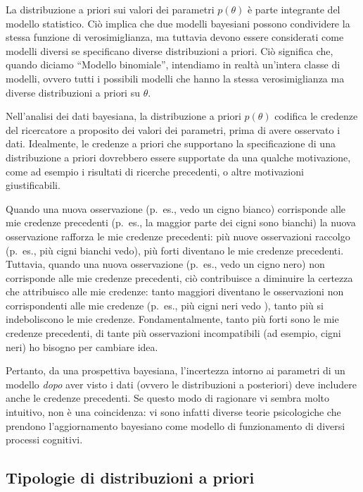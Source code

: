 \documentclass[
  11pt,
]{krantz}
\theoremstyle{definition}
\theoremstyle{definition}
\theoremstyle{definition}
\theoremstyle{definition}
\theoremstyle{remark}
\begin{document}
La distribuzione a priori sui valori dei parametri \(p(\theta)\) è parte integrante del modello statistico. Ciò implica che due modelli bayesiani possono condividere la stessa funzione di verosimiglianza, ma tuttavia devono essere considerati come modelli diversi se specificano diverse distribuzioni a priori. Ciò significa che, quando diciamo ``Modello binomiale'', intendiamo in realtà un'intera classe di modelli, ovvero tutti i possibili modelli che hanno la stessa verosimiglianza ma diverse distribuzioni a priori su \(\theta\).

Nell'analisi dei dati bayesiana, la distribuzione a priori \(p(\theta)\) codifica le credenze del ricercatore a proposito dei valori dei parametri, prima di avere osservato i dati. Idealmente, le credenze a priori che supportano la specificazione di una distribuzione a priori dovrebbero essere supportate da una qualche motivazione, come ad esempio i risultati di ricerche precedenti, o altre motivazioni giustificabili.

Quando una nuova osservazione (p.~es., vedo un cigno bianco) corrisponde alle mie credenze precedenti (p.~es., la maggior parte dei cigni sono bianchi) la nuova osservazione rafforza le mie credenze precedenti: più nuove osservazioni raccolgo (p.~es., più cigni bianchi vedo), più forti diventano le mie credenze precedenti. Tuttavia, quando una nuova osservazione (p.~es., vedo un cigno nero) non corrisponde alle mie credenze precedenti, ciò contribuisce a diminuire la certezza che attribuisco alle mie credenze: tanto maggiori diventano le osservazioni non corrispondenti alle mie credenze (p.~es., più cigni neri vedo ), tanto più si indeboliscono le mie credenze. Fondamentalmente, tanto più forti sono le mie credenze precedenti, di tante più osservazioni incompatibili (ad esempio, cigni neri) ho bisogno per cambiare idea.

Pertanto, da una prospettiva bayesiana, l'incertezza intorno ai parametri di un modello \emph{dopo} aver visto i dati (ovvero le distribuzioni a posteriori) deve includere anche le credenze precedenti. Se questo modo di ragionare vi sembra molto intuitivo, non è una coincidenza: vi sono infatti diverse teorie psicologiche che prendono l'aggiornamento bayesiano come modello di funzionamento di diversi processi cognitivi.

\hypertarget{tipologie-di-distribuzioni-a-priori}{%
\subsection{Tipologie di distribuzioni a priori}\label{tipologie-di-distribuzioni-a-priori}}
\end{document}
